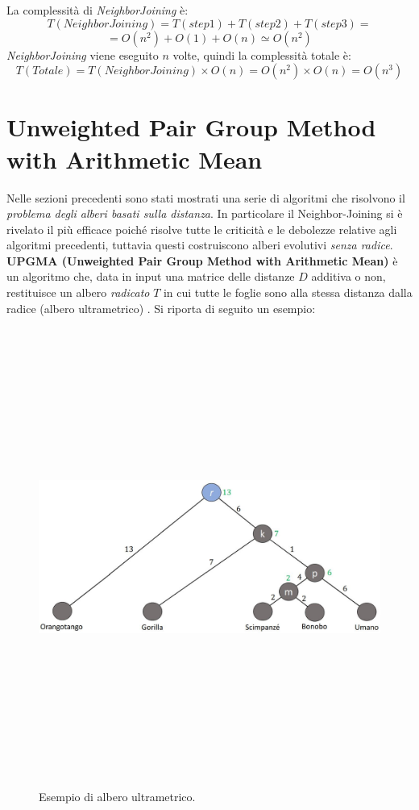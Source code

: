 La complessità di \textit{NeighborJoining} è:
	\[T(NeighborJoining)=T(step1)+T(step2)+T(step3)=\]
	\[=O(n^2)+O(1)+O(n)\simeq O(n^2)\]
\textit{NeighborJoining} viene eseguito $n$ volte, quindi la complessità totale è:
\[T(Totale)=T(NeighborJoining) \times O(n) = O(n^2) \times O(n) = O(n^3) \]

\newpage

\section{Unweighted Pair Group Method with Arithmetic Mean}
Nelle sezioni precedenti sono stati mostrati una serie di algoritmi che risolvono il \textit{problema degli alberi basati sulla distanza}. In particolare il Neighbor-Joining si è rivelato il più efficace poiché risolve tutte le criticità e le debolezze relative agli algoritmi precedenti, tuttavia questi costruiscono alberi evolutivi \textit{senza radice}.
\newline
\textbf{UPGMA (Unweighted Pair Group Method with Arithmetic Mean)} è un algoritmo che, data in input una matrice delle distanze $D$ additiva o non, restituisce un albero \textit{radicato} $T$ in cui tutte le foglie sono alla stessa distanza dalla radice (albero ultrametrico) \cite{understandingBioinf}.
\newline
Si riporta di seguito un esempio:
\begin{figure}[h!]
\centering
	\includegraphics[height=15cm, width=13cm, keepaspectratio]{rooted_upgma_1.jpg}
 	\caption{Esempio di albero ultrametrico.}
  	\label{fig:rooted_upgma_1}
\end{figure}
